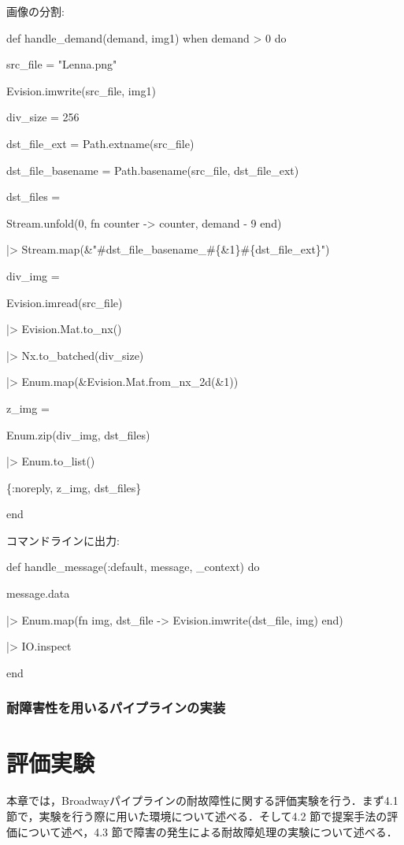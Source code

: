 \documentclass[a4paper]{jreport}	%
\begin{document}
画像の分割:

def handle\_demand(demand, img1) when demand > 0 do   

    src\_file = "Lenna.png"
    
    Evision.imwrite(src\_file, img1)
    
    div\_size = 256
    
    dst\_file\_ext = Path.extname(src\_file)
    
    dst\_file\_basename = Path.basename(src\_file, dst\_file\_ext)
    
    dst\_files =
    
      Stream.unfold(0, fn counter -> {counter, demand - 9} end)
      
      |> Stream.map(\&"\#{dst\_file\_basename}\_\#\{\&1\}\#\{dst\_file\_ext\}")
    
    div\_img =
    
    Evision.imread(src\_file)
    
    |> Evision.Mat.to\_nx()
    
    |> Nx.to\_batched(div\_size)
    
    |> Enum.map(\&Evision.Mat.from\_nx\_2d(\&1))
    
    z\_img = 
    
    Enum.zip(div\_img, dst\_files)
    
    |> Enum.to\_list()
    
    \{:noreply, z\_img, dst\_files\}
  
end

コマンドラインに出力:

  def handle\_message(:default, message, \_context) do
  
    message.data
    
    |> Enum.map(fn {img, dst\_file} -> Evision.imwrite(dst\_file, img) end)
    
    |> IO.inspect
    
  end

\subsection{耐障害性を用いるパイプラインの実装}


\chapter{評価実験}
本章では，Broadwayパイプラインの耐故障性に関する評価実験を行う．まず4.1 節で，実験を行う際に用いた環境について述べる．そして4.2 節で提案手法の評価について述べ，4.3 節で障害の発生による耐故障処理の実験について述べる．
\end{document}
